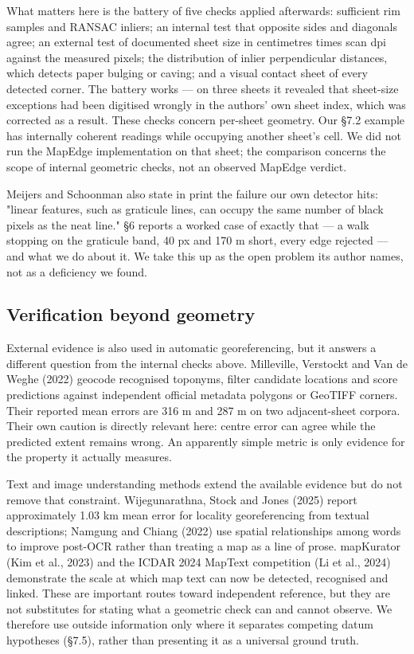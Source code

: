 \documentclass[11pt,a4paper]{article}
\begin{document}
What matters here is the battery of five checks applied afterwards: sufficient rim samples and RANSAC inliers; an internal test that opposite sides and diagonals agree; an external test of documented sheet size in centimetres times scan dpi against the measured pixels; the distribution of inlier perpendicular distances, which detects paper bulging or caving; and a visual contact sheet of every detected corner. The battery works — on three sheets it revealed that sheet-size exceptions had been digitised wrongly in the authors' own sheet index, which was corrected as a result. These checks concern per-sheet geometry. Our §7.2 example has internally coherent readings while occupying another sheet's cell. We did not run the MapEdge implementation on that sheet; the comparison concerns the scope of internal geometric checks, not an observed MapEdge verdict.

Meijers and Schoonman also state in print the failure our own detector hits: "linear features, such as graticule lines, can occupy the same number of black pixels as the neat line." §6 reports a worked case of exactly that — a walk stopping on the graticule band, 40 px and 170 m short, every edge rejected — and what we do about it. We take this up as the open problem its author names, not as a deficiency we found.

\subsection{Verification beyond geometry}

External evidence is also used in automatic georeferencing, but it answers a different question from the internal checks above. Milleville, Verstockt and Van de Weghe (2022) geocode recognised toponyms, filter candidate locations and score predictions against independent official metadata polygons or GeoTIFF corners. Their reported mean errors are 316 m and 287 m on two adjacent-sheet corpora. Their own caution is directly relevant here: centre error can agree while the predicted extent remains wrong. An apparently simple metric is only evidence for the property it actually measures.

Text and image understanding methods extend the available evidence but do not remove that constraint. Wijegunarathna, Stock and Jones (2025) report approximately 1.03 km mean error for locality georeferencing from textual descriptions; Namgung and Chiang (2022) use spatial relationships among words to improve post-OCR rather than treating a map as a line of prose. mapKurator (Kim et al., 2023) and the ICDAR 2024 MapText competition (Li et al., 2024) demonstrate the scale at which map text can now be detected, recognised and linked. These are important routes toward independent reference, but they are not substitutes for stating what a geometric check can and cannot observe. We therefore use outside information only where it separates competing datum hypotheses (§7.5), rather than presenting it as a universal ground truth.
\end{document}
